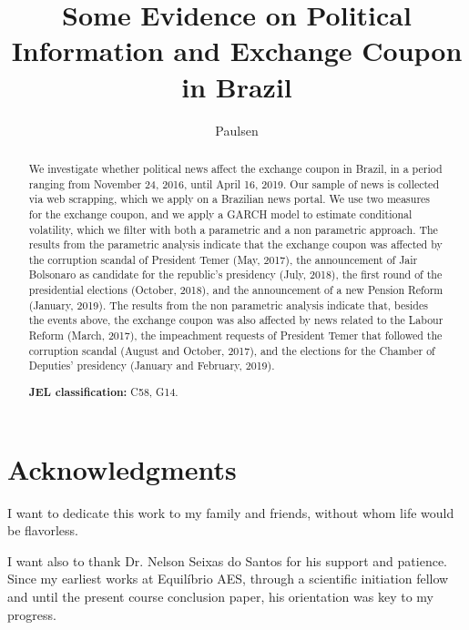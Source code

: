 \documentclass[cic,tc, english]{iiufrgs}
\title{Some Evidence on Political Information and Exchange Coupon in Brazil}
\author{Paulsen}{Bernardo Hillesheim}
\begin{document}



\chapter*{Acknowledgments}

I want to dedicate this work to my family and friends, without whom life would be flavorless. 

I want also to thank Dr. Nelson Seixas do Santos for his support and patience. Since my earliest works at Equilíbrio AES, through a scientific initiation fellow and until the present course conclusion paper, his orientation was key to my progress.



\begin{abstract}
    We investigate whether political news affect the exchange coupon in Brazil, in a period ranging from November 24, 2016, until April 16, 2019. Our sample of news is collected via web scrapping, which we apply on a Brazilian news portal. We use two measures for the exchange coupon, and we apply a GARCH model to estimate conditional volatility, which we filter with both a parametric and a non parametric approach. The results from the parametric analysis indicate that the exchange coupon was affected by the corruption scandal of President Temer (May, 2017), the announcement of Jair Bolsonaro as candidate for the republic's presidency (July, 2018), the first round of the presidential elections (October, 2018), and the announcement of a new Pension Reform (January, 2019). The results from the non parametric analysis indicate that, besides the events above, the exchange coupon was also affected by news related to the Labour Reform (March, 2017), the impeachment requests of President Temer that followed the corruption scandal (August and October, 2017), and the elections for the Chamber of Deputies' presidency (January and February, 2019).
    
    \noindent
    \textbf{JEL classification:} C58, G14.
    
\end{abstract}

\listoffigures
\end{document}
